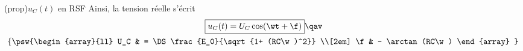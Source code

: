 \documentclass[../../main/main.tex]{subfiles}
\begin{document}
\begin{tcb*}[sidebyside, righthand ratio=.6](prop){$u_C(t)$ en RSF}
	Ainsi, la tension réelle s'écrit
	\begin{gather*}
		\boxed{u_C(t) = U_C \cos(\wt + \f)} \qav
		\\
		\left\{
		\psw{%
			\begin{array}{ll}
				U_C & = \DS\frac{E_0}{\sqrt{1+ (RC\w)^2}}
				\\[2em]
				\f  & - \arctan(RC\w)
			\end{array}
		}%
		\right.
	\end{gather*}
	\tcblower
	\noindent
	\begin{minipage}[t]{.48\linewidth}
		\vspace{0pt}
		\begin{center}
\end{center}
\end{minipage}
\end{tcb*}
\end{document}
